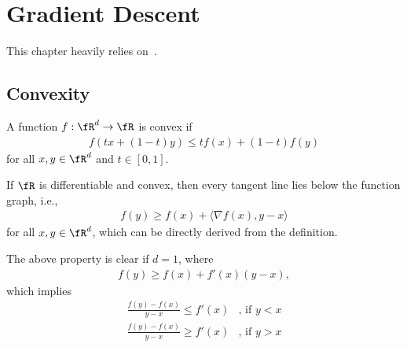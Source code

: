 \documentclass{article}
\begin{document}
% 


\section{Gradient Descent} \label{sec:gradient}
This chapter heavily relies on~\cite{gower2018convergence, ryu2022large}.

\subsection{Convexity}
\begin{definition}
    A function $f:\fR^d\rightarrow \fR$ is convex if
    \begin{align}
        f(tx + (1-t)y) \leq tf(x) + (1-t) f(y)
    \end{align}
    for all $x, y\in\fR^d$ and $t\in[0, 1]$.
\end{definition}
If $\fR$ is differentiable and convex, then every tangent line lies below the function graph, i.e.,
\begin{align}
    f(y) \geq f(x) + \langle \nabla f(x) , y-x\rangle \label{eq:convex tangent}
\end{align}
for all $x, y\in\fR^d$, which can be directly derived from the definition.

\begin{remark}
    The above property is clear if $d=1$, where
    \begin{align}
        f(y) \geq f(x) + f'(x) (y-x),
    \end{align}
    which implies
    \begin{align}
        \frac{f(y)- f(x)}{y-x} \leq f'(x) & \mbox{, if $y< x$}\\
        \frac{f(y)- f(x)}{y-x} \geq f'(x) & \mbox{, if $y> x$}
    \end{align}
\end{remark}
\end{document}
